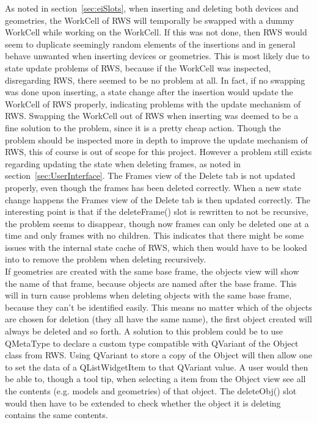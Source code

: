 As noted in section~\ref{sec:eiSlots}, when inserting and deleting both devices and geometries, the WorkCell of RWS will temporally be swapped with a dummy WorkCell while working on the WorkCell. If this was not done, then RWS would seem to duplicate seemingly random elements of the insertions and in general behave unwanted when inserting devices or geometries. This is most likely due to state update problems of RWS, because if the WorkCell was inspected, disregarding RWS, there seemed to be no problem at all. In fact, if no swapping was done upon inserting, a state change after the insertion would update the WorkCell of RWS properly, indicating problems with the update mechanism of RWS. Swapping the WorkCell out of RWS when inserting was deemed to be a fine solution to the problem, since it is a pretty cheap action. Though the problem should be inspected more in depth to improve the update mechanism of RWS, this of course is out of scope for this project. 
However a problem still exists regarding updating the state when deleting frames, as noted in section~\ref{sec:UserInterface}. The Frames view of the Delete tab is not updated properly, even though the frames has been deleted correctly. When a new state change happens the Frames view of the Delete tab is then updated correctly. The interesting point is that if the deleteFrame() slot is rewritten to not be recursive, the problem seems to disappear, though now frames can only be deleted one at a time and only frames with no children. This indicates that there might be some issues with the internal state cache of RWS, which then would have to be looked into to remove the problem when deleting recursively.\\

If geometries are created with the same base frame, the objects view will show the name of that frame, because objects are named after the base frame. This will in turn cause problems when deleting objects with the same base frame, because they can't be identified easily. This means no matter which of the objects are chosen for deletion (they all have the same name), the first object created will always be deleted and so forth. A solution to this problem could be to use QMetaType \cite{QMetaType} to declare a custom type compatible with QVariant \cite{QVariant} of the Object class from RWS. Using QVariant to store a copy of the Object will then allow one to set the data of a QListWidgetItem to that QVariant value. A user would then be able to, though a tool tip, when selecting a item from the Object view see all the contents (e.g. models and geometries) of that object. The deleteObj() slot would then have to be extended to check whether the object it is deleting contains the same contents.

